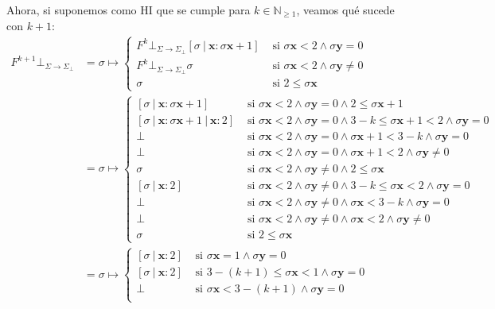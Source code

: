 \documentclass{article}
\newcommand{\N}{\mathbb{N}}
\newcommand{\x}{\textbf{x}}
\newcommand{\y}{\textbf{y}}
\newcommand{\cdom}{\Sigma \to \Sigma_\bot}
\newcommand{\cfbot}{\bot_{\cdom}}
\begin{document}
Ahora, si suponemos como HI que se cumple para $k \in \N_{\geq 1}$, veamos qué sucede con $k+1$:
\begin{equation*}
  \begin{aligned}
  F^{k+1} \cfbot &= \sigma \mapsto \begin{cases}
    F^k \cfbot [\sigma\ |\ \x : \sigma\x+1] &\text{ si } \sigma\x < 2 \land \sigma\y = 0 \\ 
    F^k \cfbot \sigma &\text{ si } \sigma\x < 2 \land \sigma\y \neq 0 \\ 
    \sigma &\text{ si } 2 \leq \sigma\x 
  \end{cases} \\ 
                 &= \sigma \mapsto \begin{cases}
                   [\sigma\ |\ \x : \sigma\x+1] &\text{ si } \sigma\x < 2 \land \sigma\y = 0 \land 2 \leq \sigma\x+1 \\ 
                   [\sigma\ |\ \x : \sigma\x+1\ |\ \x : 2] &\text{ si }\sigma\x < 2 \land \sigma\y = 0 \land 3-k \leq \sigma\x+1 < 2 \land \sigma\y = 0 \\ 
                   \bot &\text{ si }\sigma\x < 2 \land \sigma\y = 0 \land \sigma\x+1 < 3-k \land \sigma\y = 0 \\ 
                   \bot &\text{ si }\sigma\x < 2 \land \sigma\y = 0 \land \sigma\x+1 < 2 \land \sigma\y \neq 0 \\ 
                   \sigma &\text{ si }\sigma\x < 2 \land \sigma\y \neq 0 \land 2 \leq \sigma\x \\ 
                   [\sigma\ |\ \x : 2] &\text{ si } \sigma\x < 2 \land \sigma\y \neq 0 \land 3-k \leq \sigma\x < 2 \land \sigma\y = 0 \\ 
                   \bot &\text{ si }\sigma\x < 2 \land \sigma\y \neq 0 \land \sigma\x < 3-k \land \sigma\y = 0 \\ 
                   \bot &\text{ si }\sigma\x < 2 \land \sigma\y \neq 0 \land \sigma\x < 2 \land \sigma\y \neq 0 \\ 
                   \sigma &\text{ si } 2 \leq \sigma\x
                 \end{cases} \\ 
                 &= \sigma \mapsto \begin{cases}
                   [\sigma\ |\ \x : 2] &\text{ si } \sigma\x = 1 \land \sigma\y = 0 \\ 
                   [\sigma\ |\ \x : 2] &\text{ si } 3-(k+1) \leq \sigma\x < 1 \land \sigma\y = 0 \\ 
                   \bot &\text{ si } \sigma\x < 3-(k+1) \land \sigma\y = 0 \\ 

\end{cases}
\end{aligned}
\end{equation*}
\end{document}
